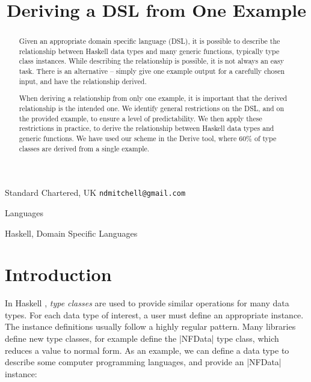\documentclass[preprint]{sigplanconf}
\begin{document}
\copyrightdata{[to be supplied]}

\titlebanner{\today{} - \currenttime{}}        %
\preprintfooter{}   %

\title{Deriving a DSL from One Example}

           {Standard Chartered, UK}
           {\verb"ndmitchell@gmail.com"}

\maketitle

\begin{abstract}
Given an appropriate domain specific language (DSL), it is possible to describe the relationship between Haskell data types and many generic functions, typically type class instances. While describing the relationship is possible, it is not always an easy task. There is an alternative -- simply give one example output for a carefully chosen input, and have the relationship derived.

When deriving a relationship from only one example, it is important that the derived relationship is the intended one. We identify general restrictions on the DSL, and on the provided example, to ensure a level of predictability. We then apply these restrictions in practice, to derive the relationship between Haskell data types and generic functions. We have used our scheme in the Derive tool, where 60\% of type classes are derived from a single example.
\end{abstract}


\terms
Languages

\keywords
Haskell, Domain Specific Languages

\section{Introduction}
\label{sec:introduction}

In Haskell \cite{haskell}, \textit{type classes} \cite{wadler:type_classes} are used to provide similar operations for many data types. For each data type of interest, a user must define an appropriate instance. The instance definitions usually follow a highly regular pattern. Many libraries define new type classes, for example \citet{trinder:strategies} define the |NFData| type class, which reduces a value to normal form. As an example, we can define a data type to describe some computer programming languages, and provide an |NFData| instance:
\end{document}
